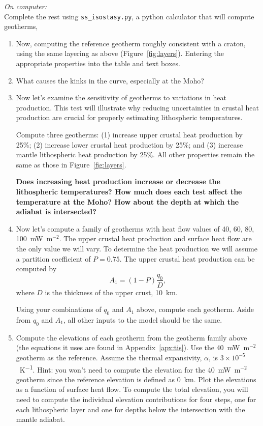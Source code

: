     {\it On computer:}\\
    Complete the rest using \verb+ss_isostasy.py+, a python calculator that will compute geotherms,
    \begin{enumerate}
        \item  Now, computing the reference geotherm roughly consistent with a craton, using the same layering as above (Figure~\ref{fig:layers}).  Entering the appropriate properties into the table and text boxes.
        
        \item What causes the kinks in the curve, especially at the Moho?
        
        \item Now let's examine the sensitivity of geotherms to variations in heat production.  This test will illustrate why reducing uncertainties in crustal heat production are crucial for properly estimating lithospheric temperatures.

        Compute three geotherms: (1) increase upper crustal heat production by 25\%; (2) increase lower crustal heat production by 25\%; and (3) increase mantle lithospheric heat production by 25\%.  All other properties remain the same as those in Figure~\ref{fig:layers}.

        {\bf Does increasing heat production increase or decrease the lithospheric temperatures?  How much does each test affect the temperature at the Moho?  How about the depth at which the adiabat is intersected?}

        \item Now let's compute a family of geotherms with heat flow values of 40, 60, 80, 100~mW~m$^{-2}$.  The upper crustal heat production and surface heat flow are the only value we will vary.  To determine the heat production we will assume a partition coefficient of $P = 0.75$.  The upper crustal heat production can be computed by
        \begin{equation}
            A_{1} = (1 - P) \frac{q_0}{D},
        \end{equation}
        where $D$ is the thickness of the upper crust, 10~km.

        Using your combinations of $q_0$ and $A_1$ above, compute each geotherm.  Aside from $q_0$ and $A_1$, all other inputs to the model should be the same.

        \item Compute the elevations of each geotherm from the geotherm family above (the equations it uses are found in Appendix~\ref{apx:tis}).  Use the 40~mW~m$^{-2}$ geotherm as the reference.  Assume the thermal expansivity, $\alpha$, is $3 \times 10^{-5}$~\si{K^{-1}}.  Hint: you won't need to compute the elevation for the 40~mW~m$^{-2}$ geotherm since the reference elevation is defined as 0~km.  Plot the elevations as a function of surface heat flow.  To compute the total elevation, you will need to compute the individual elevation contributions for four steps, one for each lithospheric layer and one for depths below the intersection with the mantle adiabat.


\end{enumerate}
